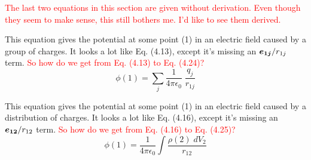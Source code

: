 \textcolor{red}{
The last two equations in this section are given without derivation.
Even though they seem to make sense, this still bothers me.
I'd like to see them derived.}

This equation gives the potential at some point (1) in an electric field
caused by a group of charges.
It looks a lot like Eq. (4.13), except it's missing an $\boldsymbol{e_{1j}}/r_{1j}$ term.
\textcolor{red}{So how do we get from Eq. (4.13) to Eq. (4.24)?}
\begin{equation}
  \phi(1) = \sum_j \frac{1}{4\pi\epsilon_0} \; \frac{q_j}{r_{1j}}
\end{equation}

This equation gives the potential at some point (1) in an electric field
caused by a distribution of charges.
It looks a lot like Eq. (4.16), except it's missing an $\boldsymbol{e_{12}}/r_{12}$ term.
\textcolor{red}{So how do we get from Eq. (4.16) to Eq. (4.25)?}
\begin{equation}
  \phi(1) = \frac{1}{4\pi\epsilon_0} \int  \frac{\rho(2)\;dV_2}{r_{12}}
\end{equation}

